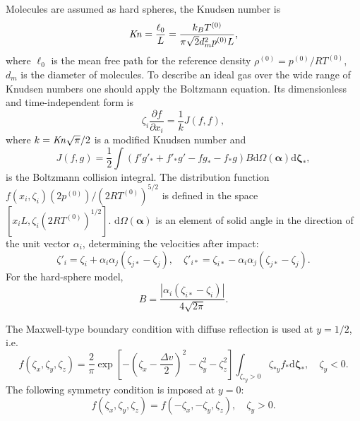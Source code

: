 \documentclass[review]{elsarticle}
\newcommand{\Kn}{\mbox{\textit{Kn}}}
\newcommand{\dd}{\mathrm{d}}
\newcommand{\pder}[2][]{\frac{\partial#1}{\partial#2}}
\newcommand{\dzeta}{\boldsymbol{\dd\zeta}}
\begin{document}
Molecules are assumed as hard spheres, the Knudsen number is
\begin{equation}\label{eq:Kn_number}
    \Kn = \frac{\ell_0}{L} = \frac{k_BT^{(0)}}{\pi\sqrt{2} d_m^2p^{(0)}L},
\end{equation}
where \(\ell_0\) is the mean free path for the reference density \(\rho^{(0)} = p^{(0)}/R T^{(0)}\),
\(d_m\) is the diameter of molecules.
To describe an ideal gas over the wide range of Knudsen numbers
one should apply the Boltzmann equation.
Its dimensionless and time-independent form is
\begin{equation}\label{eq:Boltzmann}
    \zeta_i\pder[f]{x_i} = \frac1k J(f,f),
\end{equation}
where \(k = \Kn\sqrt{\pi}/2\) is a modified Knudsen number and
\begin{equation}\label{eq:ci}
    J(f,g) = \frac12 \int (f'g'_* + f'_*g' - fg_* - f_*g) B
    \dd \Omega(\boldsymbol{\alpha}) \dzeta_*,
\end{equation}
is the Boltzmann collision integral.
The distribution function \(f(x_i,\zeta_i)(2p^{(0)})/(2RT^{(0)})^{5/2}\) is defined
in the space \([x_iL, \zeta_i(2RT^{(0)})^{1/2}]\).
\(\dd \Omega(\boldsymbol{\alpha})\) is an element of solid angle in the direction of the unit vector \(\alpha_i\),
determining the velocities after impact:
\begin{equation}\label{eq:after_impact}
    \zeta'_i = \zeta_i + \alpha_i\alpha_j(\zeta_{j*}-\zeta_j), \quad
    \zeta'_{i*} = \zeta_{i*} - \alpha_i\alpha_j(\zeta_{j*}-\zeta_j).
\end{equation}
For the hard-sphere model,
\begin{equation}\label{eq:ci_kernel}
    B = \frac{|\alpha_i(\zeta_{i*}-\zeta_i)|}{4\sqrt{2\pi}}.
\end{equation}

The Maxwell-type boundary condition with diffuse reflection is used at \(y=1/2\), i.e.
\begin{equation}\label{eq:diffuse_bc}
    f(\zeta_x,\zeta_y,\zeta_z) = \frac2{\pi} \exp\left[-\left(\zeta_x-\frac{\Delta{v}}{2}\right)^2-\zeta_y^2-\zeta_z^2\right]
        \int_{\zeta_{*y}>0}\zeta_{*y} f_* \dzeta_*, \quad \zeta_y<0.
\end{equation}
The following symmetry condition is imposed at \(y=0\):
\begin{equation}\label{eq:specular_bc}
    f(\zeta_x,\zeta_y,\zeta_z) = f(-\zeta_x,-\zeta_y,\zeta_z), \quad \zeta_y>0.
\end{equation}
\end{document}
